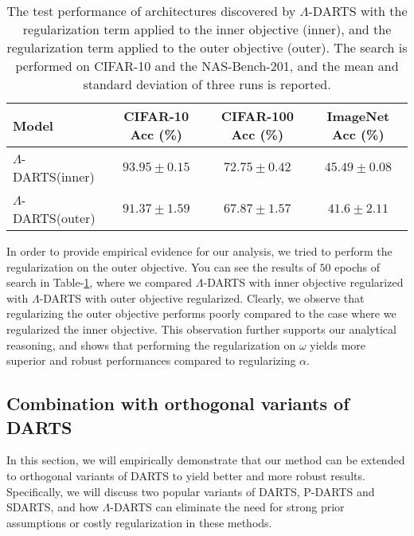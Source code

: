 \documentclass{article} \usepackage{fancyhdr, iclr2023_conference, times}
\newcommand{\mydarts}{$\Lambda$-DARTS\xspace}
\begin{document}
\par \begin{table}[t]
\centering
\caption{The test performance of architectures discovered by \mydarts with the regularization term applied to the inner objective (inner), and the regularization term applied to the outer objective (outer). The search is performed on CIFAR-10 and the NAS-Bench-201, and the mean and standard deviation of three runs is reported.} 
\label{table:outer-inner}
\begin{tabular}{l|c|c|c}
\textbf{Model} &\textbf{CIFAR-10 Acc (\%)} & \textbf{CIFAR-100 Acc (\%)} & \textbf{ImageNet Acc (\%)}\\ \hline
    \mydarts (inner) & $93.95\pm 0.15$ & $72.75\pm 0.42$ & $45.49\pm 0.08$\\
    \mydarts (outer) & $91.37\pm1.59$ & $67.87\pm 1.57$ & $41.6\pm 2.11$\\
\end{tabular}
\end{table}In order to provide empirical evidence for our analysis, we tried to perform the regularization on the outer objective. You can see the results of $50$ epochs of search in Table-\ref{table:outer-inner}, where we compared \mydarts with inner objective regularized with \mydarts with outer objective regularized. Clearly, we observe that regularizing the outer objective performs poorly compared to the case where we regularized the inner objective. This observation further supports our analytical reasoning, and shows that performing the regularization on $\omega$ yields more superior and robust performances compared to regularizing $\alpha$.
\subsection{Combination with orthogonal variants of DARTS}
\label{appndx:orthogonal-vars}
\par In this section, we will empirically demonstrate that our method can be extended to orthogonal variants of DARTS to yield better and more robust results. Specifically, we will discuss two popular variants of DARTS, P-DARTS and SDARTS, and how \mydarts can eliminate the need for strong prior assumptions or costly regularization in these methods.
\end{document}
